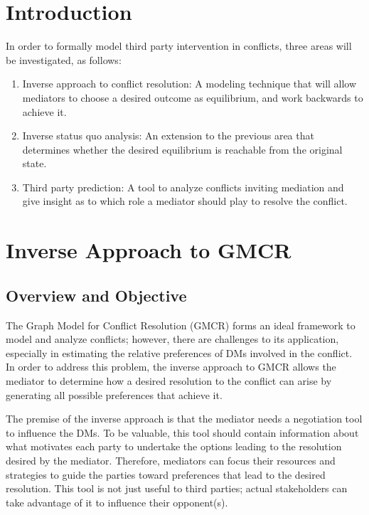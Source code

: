 \documentclass[letterpaper,12pt,titlepage,oneside,final]{book}
\begin{document}
\section{Introduction}

In order to formally model third party intervention in conflicts, three areas will be investigated, as follows:
\begin{enumerate}
\item Inverse approach to conflict resolution: A modeling technique that will allow mediators to choose a desired outcome as equilibrium, and work backwards to achieve it.
\item Inverse status quo analysis: An extension to the previous area that determines whether the desired equilibrium is reachable from the original state.
\item Third party prediction: A tool to analyze conflicts inviting mediation and give insight as to which role a mediator should play to resolve the conflict.

\end{enumerate}


\section{Inverse Approach to GMCR}
\subsection{Overview and Objective}

The Graph Model for Conflict Resolution (GMCR) forms an ideal framework to model and analyze conflicts; however, there are challenges to its application, especially in estimating the relative preferences of DMs involved in the conflict. In order to address this problem, the inverse approach to GMCR allows the mediator to determine how a desired resolution to the conflict can arise by generating all possible preferences that achieve it.

The premise of the inverse approach is that the mediator needs a negotiation tool to influence the DMs. To be valuable, this tool should contain information about what motivates each party to undertake the options leading to the resolution desired by the mediator. Therefore, mediators can focus their resources and strategies to guide the parties toward preferences that lead to the desired resolution. This tool is not just useful to third parties; actual stakeholders can take advantage of it to influence their opponent(s).
\end{document}
